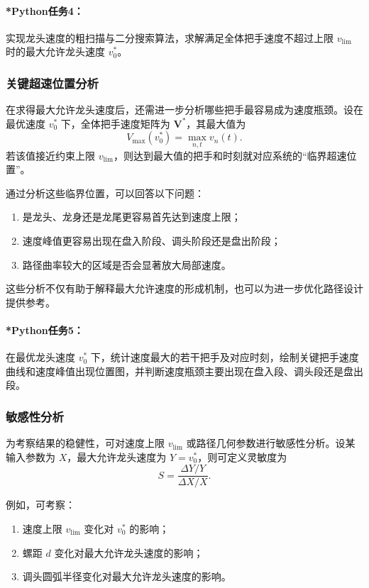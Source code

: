 \documentclass[12pt,a4paper]{ctexart}
\begin{document}
\paragraph{*Python任务4：}
实现龙头速度的粗扫描与二分搜索算法，求解满足全体把手速度不超过上限 $v_{\mathrm{lim}}$ 时的最大允许龙头速度 $v_0^\ast$。

\subsubsection{关键超速位置分析}
在求得最大允许龙头速度后，还需进一步分析哪些把手最容易成为速度瓶颈。设在最优速度 $v_0^\ast$ 下，全体把手速度矩阵为 $\bm{V}^\ast$，其最大值为
\begin{equation}
V_{\max}(v_0^\ast)=\max_{n,t} v_n(t).
\end{equation}
若该值接近约束上限 $v_{\mathrm{lim}}$，则达到最大值的把手和时刻就对应系统的“临界超速位置”。

通过分析这些临界位置，可以回答以下问题：

\begin{enumerate}
    \item 是龙头、龙身还是龙尾更容易首先达到速度上限；
    \item 速度峰值更容易出现在盘入阶段、调头阶段还是盘出阶段；
    \item 路径曲率较大的区域是否会显著放大局部速度。
\end{enumerate}

这些分析不仅有助于解释最大允许速度的形成机制，也可以为进一步优化路径设计提供参考。

\paragraph{*Python任务5：}
在最优龙头速度 $v_0^\ast$ 下，统计速度最大的若干把手及对应时刻，绘制关键把手速度曲线和速度峰值出现位置图，并判断速度瓶颈主要出现在盘入段、调头段还是盘出段。

\subsubsection{敏感性分析}
为考察结果的稳健性，可对速度上限 $v_{\mathrm{lim}}$ 或路径几何参数进行敏感性分析。设某输入参数为 $X$，最大允许龙头速度为 $Y=v_0^\ast$，则可定义灵敏度为
\begin{equation}
S=\frac{\Delta Y / Y}{\Delta X / X}.
\end{equation}

例如，可考察：

\begin{enumerate}
    \item 速度上限 $v_{\mathrm{lim}}$ 变化对 $v_0^\ast$ 的影响；
    \item 螺距 $d$ 变化对最大允许龙头速度的影响；
    \item 调头圆弧半径变化对最大允许龙头速度的影响。
\end{enumerate}
\end{document}
